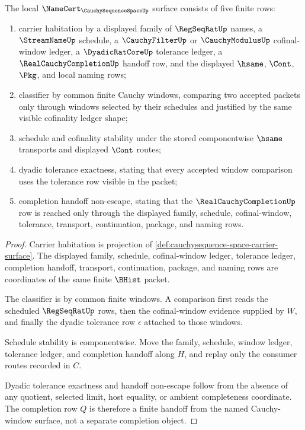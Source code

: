 \begin{theorem}
\label{thm:cauchysequence-space-namecert-obligation-surface}
The local $\NameCert_{\CauchySequenceSpaceUp}$ surface consists of five finite rows:
\begin{enumerate}
\item carrier habitation by a displayed family of $\RegSeqRatUp$ names, a $\StreamNameUp$ schedule, a $\CauchyFilterUp$ or $\CauchyModulusUp$ cofinal-window ledger, a $\DyadicRatCoreUp$ tolerance ledger, a $\RealCauchyCompletionUp$ handoff row, and the displayed $\hsame$, $\Cont$, $\Pkg$, and local naming rows;
\item classifier by common finite Cauchy windows, comparing two accepted packets only through windows selected by their schedules and justified by the same visible cofinality ledger shape;
\item schedule and cofinality stability under the stored componentwise $\hsame$ transports and displayed $\Cont$ routes;
\item dyadic tolerance exactness, stating that every accepted window comparison uses the tolerance row visible in the packet;
\item completion handoff non-escape, stating that the $\RealCauchyCompletionUp$ row is reached only through the displayed family, schedule, cofinal-window, tolerance, transport, continuation, package, and naming rows.
\end{enumerate}
\end{theorem}
\begin{proof}
Carrier habitation is projection of \autoref{def:cauchysequence-space-carrier-surface}. The displayed family, schedule, cofinal-window ledger, tolerance ledger, completion handoff, transport, continuation, package, and naming rows are coordinates of the same finite $\BHist$ packet.

The classifier is by common finite windows. A comparison first reads the scheduled $\RegSeqRatUp$ rows, then the cofinal-window evidence supplied by $W$, and finally the dyadic tolerance row $\epsilon$ attached to those windows.

Schedule stability is componentwise. Move the family, schedule, window ledger, tolerance ledger, and completion handoff along $H$, and replay only the consumer routes recorded in $C$.

Dyadic tolerance exactness and handoff non-escape follow from the absence of any quotient, selected limit, host equality, or ambient completeness coordinate. The completion row $Q$ is therefore a finite handoff from the named Cauchy-window surface, not a separate completion object.
\end{proof}


